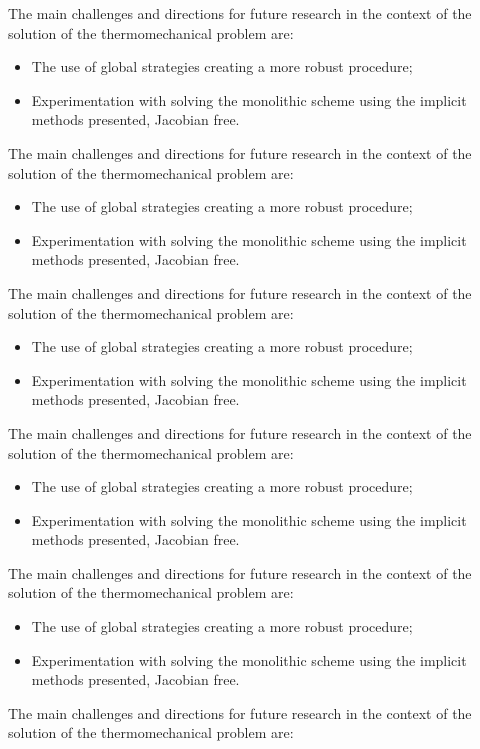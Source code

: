 The main challenges and directions for future research in the context of the solution of the thermomechanical problem are:
\begin{itemize}
  \item The use of global strategies creating a more robust procedure;
  \item Experimentation with solving the monolithic scheme using the implicit methods presented, Jacobian free.
\end{itemize}
The main challenges and directions for future research in the context of the solution of the thermomechanical problem are:
\begin{itemize}
  \item The use of global strategies creating a more robust procedure;
  \item Experimentation with solving the monolithic scheme using the implicit methods presented, Jacobian free.
\end{itemize}
The main challenges and directions for future research in the context of the solution of the thermomechanical problem are:
\begin{itemize}
  \item The use of global strategies creating a more robust procedure;
  \item Experimentation with solving the monolithic scheme using the implicit methods presented, Jacobian free.
\end{itemize}
The main challenges and directions for future research in the context of the solution of the thermomechanical problem are:
\begin{itemize}
  \item The use of global strategies creating a more robust procedure;
  \item Experimentation with solving the monolithic scheme using the implicit methods presented, Jacobian free.
\end{itemize}
The main challenges and directions for future research in the context of the solution of the thermomechanical problem are:
\begin{itemize}
  \item The use of global strategies creating a more robust procedure;
  \item Experimentation with solving the monolithic scheme using the implicit methods presented, Jacobian free.
\end{itemize}
The main challenges and directions for future research in the context of the solution of the thermomechanical problem are:
